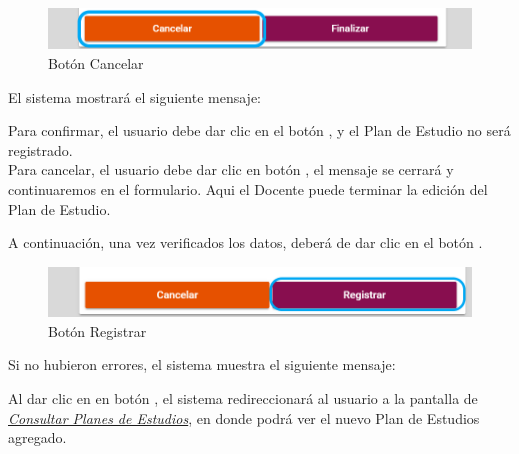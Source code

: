 \begin{figure}[!hbtp]
    \centering
    \hypertarget{cancel2}{\includegraphics[width=0.7\linewidth]{images/SP4-GPE/cancelarPE}}
    \caption{Botón Cancelar}
    \label{cancel2}
\end{figure}

El sistema mostrará el siguiente mensaje:

Para confirmar, el usuario debe dar clic en el botón  , y el Plan de Estudio no será registrado.\\

Para cancelar, el usuario debe dar clic en botón  , el mensaje se cerrará y continuaremos en el formulario. Aqui el Docente puede terminar la edición del Plan de Estudio.

A continuación, una vez verificados los datos, deberá de dar clic en el botón .
\begin{figure}[!hbtp]
    \centering
    \hypertarget{btnreg}{\includegraphics[width=0.7\linewidth]{images/SP4-GPE/registrarB}}
    \caption{Botón Registrar}
    \label{btnreg}
\end{figure}

Si no hubieron errores, el sistema muestra el siguiente mensaje:

Al dar clic en en botón , el sistema redireccionará al usuario a la pantalla de \hyperlink{consultarPE}{\textit{Consultar Planes de Estudios}}, en donde podrá ver el nuevo Plan de Estudios agregado.\\
\newpage
